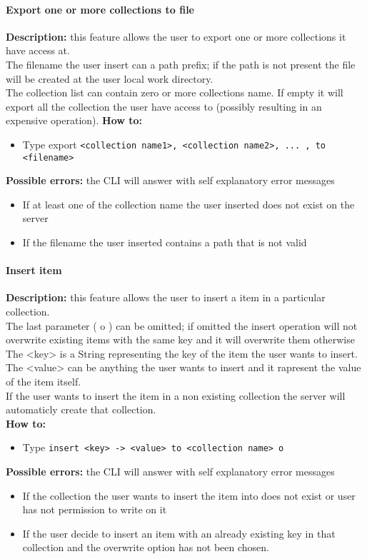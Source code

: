 \documentclass{scalatekids-article}
\begin{document}
\paragraph{Export one or more collections to file}
\label{sec:export}
\textbf{Description:} this feature allows the user to export one or more collections it have access at.\\
The filename the user insert can a path prefix; if the path is not present the file will be created at the user local work directory.\\
The collection list can contain zero or more collections name. If empty it will export all the collection the user have access to (possibly resulting in an expensive operation).
\textbf{How to:} 
\begin{itemize}
	\item Type export \texttt{<collection name1>, <collection name2>, ... , to <filename>}
\end{itemize}
\textbf{Possible errors:} the CLI will answer with self explanatory error messages 
\begin{itemize}
	\item If at least one of the collection name the user inserted does not exist on the server
	\item If the filename the user inserted contains a path that is not valid
\end{itemize}

\paragraph{Insert item}
\label{sec:insertitem}
\textbf{Description:} this feature allows the user to insert a item in a particular collection.\\
The last parameter ( o ) can be omitted; if omitted the insert operation will not overwrite existing items with the same key and it will overwrite them otherwise \\
The <key> is a String representing the key of the item the user wants to insert.\\
The <value> can be anything the user wants to insert and it rapresent the value of the item itself.\\
If the user wants to insert the item in a non existing collection the server 
will automaticly create that collection.\\
\textbf{How to:} 
\begin{itemize}
	\item Type \texttt{insert <key> -> <value> to <collection name> o}
\end{itemize}
\textbf{Possible errors:} the CLI will answer with self explanatory error messages 
\begin{itemize}
	\item If the collection the user wants to insert the item into does not exist or user has not permission to write on it
	\item If the user decide to insert an item with an already existing key in that collection and the overwrite option has not been chosen.  
\end{itemize}
\end{document}
